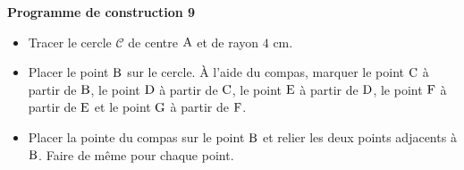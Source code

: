 \documentclass[exercice,a4]{thedocument}%
\begin{document}
%
\noindent\textbf{Programme de construction 9}\par\smallskip\noindent
\begin{itemize}
    \item Tracer le cercle $\mathcal{C}$ de centre $\text{A}$ et de
    rayon $4\text{ cm}$.
    \item Placer le point $\text{B}$ sur le cercle. À l'aide du
    compas, marquer le point $\text{C}$ à partir de
    $\text{B}$, le point $\text{D}$ à partir de
    $\text{C}$, le point $\text{E}$ à partir de
    $\text{D}$, le point $\text{F}$ à partir de
    $\text{E}$ et le point $\text{G}$ à partir de
    $\text{F}$.
    \item Placer la pointe du compas sur le point $\text{B}$ et
    relier les deux points adjacents à $\text{B}$. Faire de même pour
    chaque point.
\end{itemize}
\end{document}
